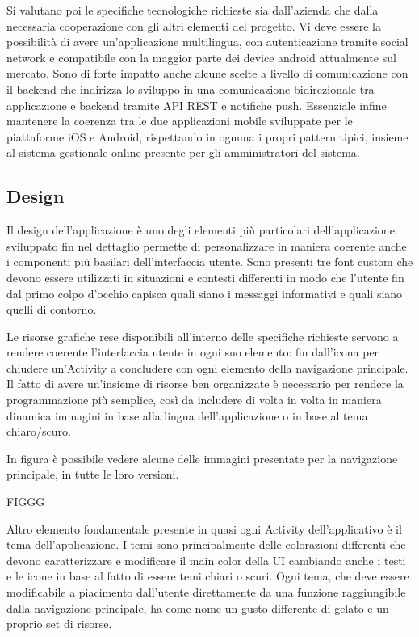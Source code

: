 Si valutano poi le specifiche tecnologiche richieste sia dall'azienda che dalla necessaria cooperazione con gli altri elementi del progetto.
Vi deve essere la possibilità di avere un'applicazione multilingua, con autenticazione tramite social network e compatibile con la maggior parte dei device android attualmente sul mercato.
Sono di forte impatto anche alcune scelte a livello di comunicazione con il backend che indirizza lo sviluppo in una comunicazione bidirezionale tra applicazione e backend tramite API REST e notifiche push.
Essenziale infine mantenere la coerenza tra le due applicazioni mobile sviluppate per le piattaforme iOS e Android, rispettando in ognuna i propri pattern tipici, insieme al sistema gestionale online presente per gli amministratori del sistema.

\subsection{Design}
Il design dell'applicazione è uno degli elementi più particolari dell'applicazione: sviluppato fin nel dettaglio permette di personalizzare in maniera coerente anche i componenti più basilari dell'interfaccia utente.
Sono presenti tre font custom che devono essere utilizzati in situazioni e contesti differenti in modo che l'utente fin dal primo colpo d'occhio capisca quali siano i messaggi informativi e quali siano quelli di contorno.

Le risorse grafiche rese disponibili all'interno delle specifiche richieste servono a rendere coerente l'interfaccia utente in ogni suo elemento: fin dall'icona per chiudere un'Activity a concludere con ogni elemento della navigazione principale.
Il fatto di avere un'insieme di risorse ben organizzate è necessario per rendere la programmazione più semplice, così da includere di volta in volta in maniera dinamica immagini in base alla lingua dell'applicazione o in base al tema chiaro/scuro.

In figura è possibile vedere alcune delle immagini presentate per la navigazione principale, in tutte le loro versioni.

FIGGG

Altro elemento fondamentale presente in quasi ogni Activity dell'applicativo è il tema dell'applicazione.
I temi sono principalmente delle colorazioni differenti che devono caratterizzare e modificare il main color della UI cambiando anche i testi e le icone in base al fatto di essere temi chiari o scuri.
Ogni tema, che deve essere modificabile a piacimento dall'utente direttamente da una funzione raggiungibile dalla navigazione principale, ha come nome un gusto differente di gelato e un proprio set di risorse.

